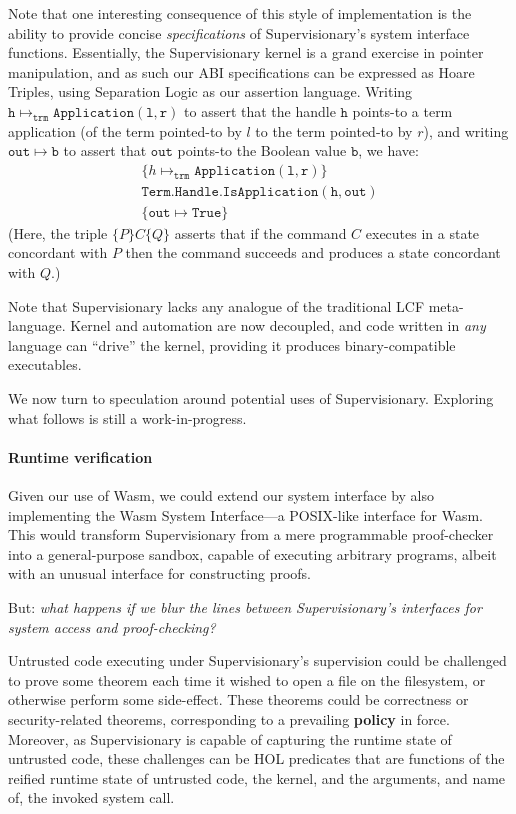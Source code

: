 \documentclass[sigplan, review]{acmart}
\newcommand{\deffont}[1]{\textbf{#1}}
\begin{document}
Note that one interesting consequence of this style of implementation is the ability to provide concise \emph{specifications} of Supervisionary's system interface functions.
Essentially, the Supervisionary kernel is a grand exercise in pointer manipulation, and as such our ABI specifications can be expressed as Hoare Triples, using Separation Logic as our assertion language.
Writing $\mathtt{h} \mapsto_{\mathtt{trm}} \mathtt{Application(l, r)}$ to assert that the handle $\mathtt{h}$ points-to a term application (of the term pointed-to by $l$ to the term pointed-to by $r$), and writing $\mathtt{out} \mapsto \mathtt{b}$ to assert that $\mathtt{out}$ points-to the Boolean value $\mathtt{b}$, we have:
\begin{gather*}
\{ h \mapsto_{\mathtt{trm}} \mathtt{Application(l, r)} \} \\
\mathtt{Term.Handle.IsApplication(h, out)} \\
\{ \mathtt{out} \mapsto \mathtt{True} \}
\end{gather*}
(Here, the triple $\{ P \} C \{ Q \}$ asserts that if the command $C$ executes in a state concordant with $P$ then the command succeeds and produces a state concordant with $Q$.)

Note that Supervisionary lacks any analogue of the traditional LCF meta-language.
Kernel and automation are now decoupled, and code written in \emph{any} language can ``drive'' the kernel, providing it produces binary-compatible executables.

We now turn to speculation around potential uses of Supervisionary.
Exploring what follows is still a work-in-progress.


\paragraph{Runtime verification}

Given our use of Wasm, we could extend our system interface by also implementing the Wasm System Interface---a POSIX-like interface for Wasm.
This would transform Supervisionary from a mere programmable proof-checker into a general-purpose sandbox, capable of executing arbitrary programs, albeit with an unusual interface for constructing proofs.

But: \emph{what happens if we blur the lines between Supervisionary's interfaces for system access and proof-checking?}

Untrusted code executing under Supervisionary's supervision could be challenged to prove some theorem each time it wished to open a file on the filesystem, or otherwise perform some side-effect.
These theorems could be correctness or security-related theorems, corresponding to a prevailing \deffont{policy} in force.
Moreover, as Supervisionary is capable of capturing the runtime state of untrusted code, these challenges can be HOL predicates that are functions of the reified runtime state of untrusted code, the kernel, and the arguments, and name of, the invoked system call.
\end{document}
